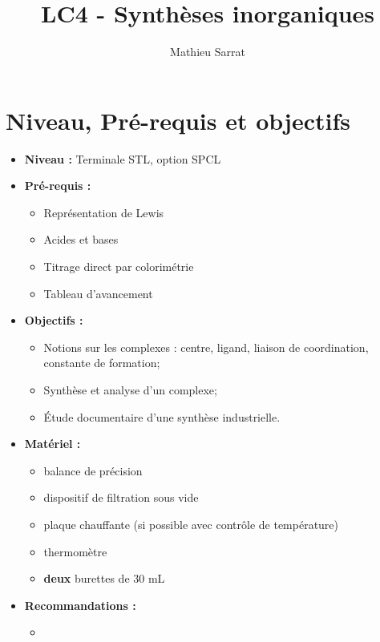 \documentclass[11pt,a4paper]{report}
\author{Mathieu Sarrat}
\title{LC4 - Synthèses inorganiques}
\begin{document}
\maketitle

\section*{Niveau, Pré-requis et objectifs}
\begin{itemize}
	\item \textbf{Niveau :} Terminale STL, option SPCL \\
	
	\item \textbf{Pré-requis :}
	\begin{itemize}
		\item Représentation de Lewis
		\item Acides et bases
		\item Titrage direct par colorimétrie		
		\item Tableau d'avancement\\
	\end{itemize}
	
	\item \textbf{Objectifs :}
	\begin{itemize}
		\item Notions sur les complexes : centre, ligand, liaison de coordination, 
			constante de formation;
		\item Synthèse et analyse d'un complexe;
		\item Étude documentaire d'une synthèse industrielle.\\
	\end{itemize}
		
	\item \textbf{Matériel :}
	\begin{itemize}
		\item balance de précision
		\item dispositif de filtration sous vide
		\item plaque chauffante (si possible avec contrôle de température)
		\item thermomètre
		\item \textbf{deux} burettes de 30 mL\\
	\end{itemize}
		
	\item \textbf{Recommandations :}
	\begin{itemize}
		\item 
	\end{itemize}
\end{itemize}
\end{document}
